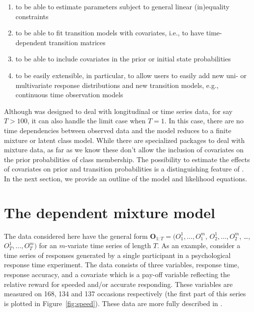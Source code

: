 \documentclass[article]{jss}
\newcommand{\vc}{\mathbf}
\begin{document}
\begin{enumerate}
	
	\item to be able to estimate parameters subject to general
	linear (in)equality constraints
	
	\item to be able to fit transition models with covariates, i.e.,
	to have time-dependent transition matrices
	
	\item to be able to include covariates in the prior or initial
	state probabilities
	
	\item to be easily extensible, in particular, to allow users to
	easily add new uni- or multivariate response distributions and
	new transition models, e.g., continuous time observation models
	
\end{enumerate}

Although  was designed to deal with longitudinal or time
series data, for say $T>100$, it can also handle the limit case when
$T=1$.  In this case, there are no time dependencies between observed
data and the model reduces to a finite mixture or latent class model.
While there are specialized packages to deal with mixture data, as far
as we know these don't allow the inclusion of covariates on the prior
probabilities of class membership.  The possibility to estimate the
effects of covariates on prior and transition probabilities is a
distinguishing feature of .  In the next section, we
provide an outline of the model and likelihood equations.


\section{The dependent mixture model}

The data considered here have the general form $\vc{O}_{1:T}=
(O_{1}^{1}, \ldots, O_{1}^{m}$, $O_{2}^{1}, \ldots, O_{2}^{m}$,
\ldots, $O_{T}^{1}, \ldots, O_{T}^{m})$ for an $m$-variate time series
of length $T$.  As an example, consider a time series of responses
generated by a single participant in a psychological response time
experiment.  The data consists of three variables, response time,
response accuracy, and a covariate which is a pay-off variable
reflecting the relative reward for speeded and/or accurate responding.
These variables are measured on 168, 134 and 137 occasions
respectively (the first part of this series is plotted in
Figure~\ref{fig:speed}).  These data are more fully described in
\citet{Dutilh2009}.
\end{document}
